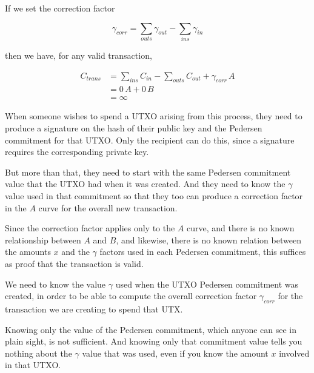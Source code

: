 \documentclass{yellowpaper}
\begin{document}
If we set the correction factor

$$\gamma_{corr} = \sum_{outs} \gamma_{out} - \sum_{ins} \gamma_{in}$$

then we have, for any valid transaction,

$$
\begin{align}
C_{trans} &= \sum_{ins} C_{in} - \sum_{outs} C_{out} + \gamma_{corr} \, A \\
&= 0 \, A + 0 \, B \\
&= \infty
\end{align}
$$

When someone wishes to spend a UTXO arising from this process, they need to produce a signature on the hash of their public key and the Pedersen commitment for that UTXO. Only the recipient can do this, since a signature requires the corresponding private key. 

But more than that, they need to start with the same Pedersen commitment value that the UTXO had when it was created. And they need to know the $\gamma$ value used in that commitment so that they too can produce a correction factor in the $A$ curve for the overall new transaction.

Since the correction factor applies only to the $A$ curve, and there is no known relationship between $A$ and $B$, and likewise, there is no known relation between the amounts $x$ and the $\gamma$ factors used in each Pedersen commitment, this suffices as proof that the transaction is valid. 

We need to know the value $\gamma$ used when the UTXO Pedersen commitment was created, in order to be able to compute the overall correction factor $\gamma_{corr}$ for the transaction we are creating to spend that UTX. 

Knowing only the value of the Pedersen commitment, which anyone can see in plain sight, is not sufficient. And knowing only that commitment value tells you nothing about the $\gamma$ value that was used, even if you know the amount $x$ involved in that UTXO.
\end{document}
